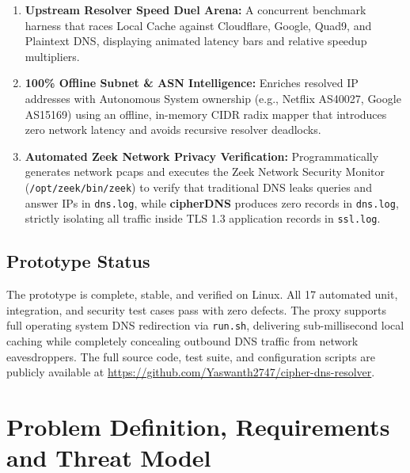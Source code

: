 \documentclass[10pt,a4paper]{article}
\begin{document}
\begin{enumerate}
    \item \textbf{Upstream Resolver Speed Duel Arena:} A concurrent benchmark harness that races Local Cache against Cloudflare, Google, Quad9, and Plaintext DNS, displaying animated latency bars and relative speedup multipliers.
    \item \textbf{100\% Offline Subnet \& ASN Intelligence:} Enriches resolved IP addresses with Autonomous System ownership (e.g., Netflix AS40027, Google AS15169) using an offline, in-memory CIDR radix mapper that introduces zero network latency and avoids recursive resolver deadlocks.
    \item \textbf{Automated Zeek Network Privacy Verification:} Programmatically generates network pcaps and executes the Zeek Network Security Monitor (\texttt{/opt/zeek/bin/zeek}) to verify that traditional DNS leaks queries and answer IPs in \texttt{dns.log}, while \textbf{cipherDNS} produces zero records in \texttt{dns.log}, strictly isolating all traffic inside TLS 1.3 application records in \texttt{ssl.log}.
\end{enumerate}

\subsection*{Prototype Status}
The prototype is complete, stable, and verified on Linux. All 17 automated unit, integration, and security test cases pass with zero defects. The proxy supports full operating system DNS redirection via \texttt{run.sh}, delivering sub-millisecond local caching while completely concealing outbound DNS traffic from network eavesdroppers. The full source code, test suite, and configuration scripts are publicly available at \url{https://github.com/Yaswanth2747/cipher-dns-resolver}.

\section{Problem Definition, Requirements and Threat Model}
\end{document}
